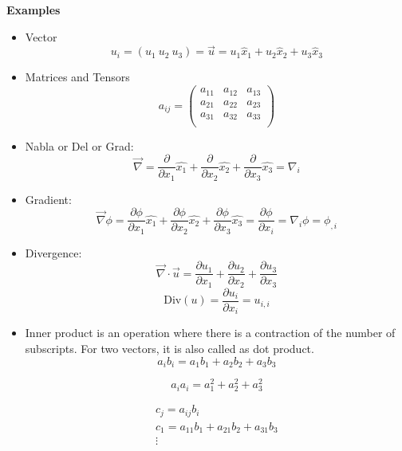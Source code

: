 {\bf Examples}
\begin{itemize}

\item Vector
$$ u_i = \left( u_1 \  u_2 \  u_3 \right) = \vec{u} = u_1 \hat{x}_1 + u_2 \hat{x}_2 + u_3 \hat{x}_3  $$

\item Matrices and Tensors
\begin{equation*}
a_{ij} = \left( \begin{array}{ccc}
a_{11} & a_{12} & a_{13} \\
a_{21} & a_{22} & a_{23} \\
a_{31} & a_{32} & a_{33} \\
\end{array}\right) 
\end{equation*} 

\item Nabla or Del or Grad:
\begin{equation*}
\vec{\nabla} =
\frac{\partial}{\partial x_1} \hat{x_1} +
\frac{\partial}{\partial x_2} \hat{x_2} +
\frac{\partial}{\partial x_3} \hat{x_3}
= \nabla_i
\end{equation*} 

\item Gradient:
\begin{equation*}
\vec{\nabla}\phi =
\frac{\partial \phi}{\partial x_1} \hat{x_1} +
\frac{\partial \phi}{\partial x_2} \hat{x_2} +
\frac{\partial \phi}{\partial x_3} \hat{x_3}
= \frac{\partial \phi}{\partial x_i} 
= \nabla_i\phi 
= \phi_{,i}
\end{equation*} 

\item Divergence:
$$ \vec{\nabla}\cdot\vec{u} = \frac{\partial u_1}{\partial x_1} + \frac{\partial u_2}{\partial x_2} + \frac{\partial u_3}{\partial x_3} $$
$$\text{Div}(u) = \frac{\partial u_i}{\partial x_i} = u_{i,i} $$

\item Inner product  is an operation where there is a contraction of the number of subscripts. For two vectors, it is also called as dot product.
$$a_{i}b_{i} = a_1b_1 + a_2b_2 + a_3b_3 $$

$$ a_{i}a_{i} = a_1^2 + a_2^2 + a_3^2 $$

\begin{equation*}
\begin{array}{c}
c_j = a_{ij}b_{i} \\
c_1 = a_{11}b_1 + a_{21}b_2 + a_{31}b_3\\
\vdots
\end{array}
\end{equation*} 



\end{itemize}
